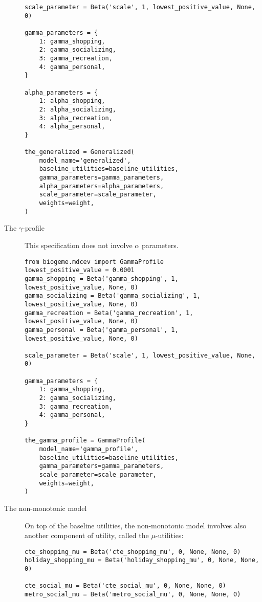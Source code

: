 \documentclass[12pt,a4paper]{article}
\begin{document}
\begin{description}
\begin{center}
\begin{lstlisting}
scale_parameter = Beta('scale', 1, lowest_positive_value, None, 0)

gamma_parameters = {
    1: gamma_shopping,
    2: gamma_socializing,
    3: gamma_recreation,
    4: gamma_personal,
}

alpha_parameters = {
    1: alpha_shopping,
    2: alpha_socializing,
    3: alpha_recreation,
    4: alpha_personal,
}

the_generalized = Generalized(
    model_name='generalized',
    baseline_utilities=baseline_utilities,
    gamma_parameters=gamma_parameters,
    alpha_parameters=alpha_parameters,
    scale_parameter=scale_parameter,
    weights=weight,
)
         \end{lstlisting}
     \end{center}
    \item [The $\gamma$-profile] This specification does not involve $\alpha$ parameters.
    \begin{center}
         \begin{lstlisting}
from biogeme.mdcev import GammaProfile
lowest_positive_value = 0.0001
gamma_shopping = Beta('gamma_shopping', 1, lowest_positive_value, None, 0)
gamma_socializing = Beta('gamma_socializing', 1, lowest_positive_value, None, 0)
gamma_recreation = Beta('gamma_recreation', 1, lowest_positive_value, None, 0)
gamma_personal = Beta('gamma_personal', 1, lowest_positive_value, None, 0)

scale_parameter = Beta('scale', 1, lowest_positive_value, None, 0)

gamma_parameters = {
    1: gamma_shopping,
    2: gamma_socializing,
    3: gamma_recreation,
    4: gamma_personal,
}

the_gamma_profile = GammaProfile(
    model_name='gamma_profile',
    baseline_utilities=baseline_utilities,
    gamma_parameters=gamma_parameters,
    scale_parameter=scale_parameter,
    weights=weight,
)
         \end{lstlisting}
     \end{center}
    \item[The non-monotonic model] On top of the baseline utilities, the non-monotonic model involves also another component of
      utility, called the $\mu$-utilities:
      \begin{center}
        \begin{lstlisting}
cte_shopping_mu = Beta('cte_shopping_mu', 0, None, None, 0)
holiday_shopping_mu = Beta('holiday_shopping_mu', 0, None, None, 0)

cte_social_mu = Beta('cte_social_mu', 0, None, None, 0)
metro_social_mu = Beta('metro_social_mu', 0, None, None, 0)


\end{lstlisting}
\end{center}
\end{description}
\end{document}
